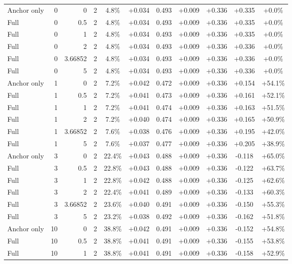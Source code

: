 \begin{table}[htbp]
\begin{tabular}{lrrrccccccc}
Anchor only & 0 & 0 & 2 & 4.8\% & +0.034 & 0.493 & +0.009 & +0.336 & +0.335 & +0.0\% \\
Full & 0 & 0.5 & 2 & 4.8\% & +0.034 & 0.493 & +0.009 & +0.336 & +0.335 & +0.0\% \\
Full & 0 & 1 & 2 & 4.8\% & +0.034 & 0.493 & +0.009 & +0.336 & +0.335 & +0.0\% \\
Full & 0 & 2 & 2 & 4.8\% & +0.034 & 0.493 & +0.009 & +0.336 & +0.336 & +0.0\% \\
Full & 0 & 3.66852 & 2 & 4.8\% & +0.034 & 0.493 & +0.009 & +0.336 & +0.336 & +0.0\% \\
Full & 0 & 5 & 2 & 4.8\% & +0.034 & 0.493 & +0.009 & +0.336 & +0.336 & +0.0\% \\
Anchor only & 1 & 0 & 2 & 7.2\% & +0.042 & 0.472 & +0.009 & +0.336 & +0.154 & +54.1\% \\
Full & 1 & 0.5 & 2 & 7.2\% & +0.041 & 0.473 & +0.009 & +0.336 & +0.161 & +52.1\% \\
Full & 1 & 1 & 2 & 7.2\% & +0.041 & 0.474 & +0.009 & +0.336 & +0.163 & +51.5\% \\
Full & 1 & 2 & 2 & 7.2\% & +0.040 & 0.474 & +0.009 & +0.336 & +0.165 & +50.9\% \\
Full & 1 & 3.66852 & 2 & 7.6\% & +0.038 & 0.476 & +0.009 & +0.336 & +0.195 & +42.0\% \\
Full & 1 & 5 & 2 & 7.6\% & +0.037 & 0.477 & +0.009 & +0.336 & +0.205 & +38.9\% \\
Anchor only & 3 & 0 & 2 & 22.4\% & +0.043 & 0.488 & +0.009 & +0.336 & -0.118 & +65.0\% \\
Full & 3 & 0.5 & 2 & 22.8\% & +0.043 & 0.488 & +0.009 & +0.336 & -0.122 & +63.7\% \\
Full & 3 & 1 & 2 & 22.8\% & +0.042 & 0.488 & +0.009 & +0.336 & -0.125 & +62.6\% \\
Full & 3 & 2 & 2 & 22.4\% & +0.041 & 0.489 & +0.009 & +0.336 & -0.133 & +60.3\% \\
Full & 3 & 3.66852 & 2 & 23.6\% & +0.040 & 0.491 & +0.009 & +0.336 & -0.150 & +55.3\% \\
Full & 3 & 5 & 2 & 23.2\% & +0.038 & 0.492 & +0.009 & +0.336 & -0.162 & +51.8\% \\
Anchor only & 10 & 0 & 2 & 38.8\% & +0.042 & 0.491 & +0.009 & +0.336 & -0.152 & +54.8\% \\
Full & 10 & 0.5 & 2 & 38.8\% & +0.041 & 0.491 & +0.009 & +0.336 & -0.155 & +53.8\% \\
Full & 10 & 1 & 2 & 38.8\% & +0.041 & 0.491 & +0.009 & +0.336 & -0.158 & +52.9\% \\

\end{tabular}
\end{table}
